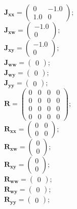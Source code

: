 \documentclass[11pt, oneside]{article}      %
\begin{document}
%
\\
%
$ \mathbf{J_{xx}} = \left(\begin{array}{cc}0 & -1.0\\1.0 & 0\end{array}\right) ; $ 
%
\\
%
$ \mathbf{J_{xw}} = \left(\begin{array}{c}-1.0\\0\end{array}\right) ; $ 
%
\\
%
$ \mathbf{J_{xy}} = \left(\begin{array}{c}-1.0\\0\end{array}\right) ; $ 
%
\\
%
$ \mathbf{J_{ww}} = \left(\begin{array}{c}0\end{array}\right) ; $ 
%
\\
%
$ \mathbf{J_{wy}} = \left(\begin{array}{c}0\end{array}\right) ; $ 
%
\\
%
$ \mathbf{J_{yy}} = \left(\begin{array}{c}0\end{array}\right) ; $ 
%
\\
%
$ \mathbf{R} = \left(\begin{array}{cccc}0 & 0 & 0 & 0\\0 & 0 & 0 & 0\\0 & 0 & 0 & 0\\0 & 0 & 0 & 0\end{array}\right) ; $ 
%
\\
%
$ \mathbf{R_{xx}} = \left(\begin{array}{cc}0 & 0\\0 & 0\end{array}\right) ; $ 
%
\\
%
$ \mathbf{R_{xw}} = \left(\begin{array}{c}0\\0\end{array}\right) ; $ 
%
\\
%
$ \mathbf{R_{xy}} = \left(\begin{array}{c}0\\0\end{array}\right) ; $ 
%
\\
%
$ \mathbf{R_{ww}} = \left(\begin{array}{c}0\end{array}\right) ; $ 
%
\\
%
$ \mathbf{R_{wy}} = \left(\begin{array}{c}0\end{array}\right) ; $ 
%
\\
%
$ \mathbf{R_{yy}} = \left(\begin{array}{c}0\end{array}\right) ; $ 
%
\\
%
\end{document}
